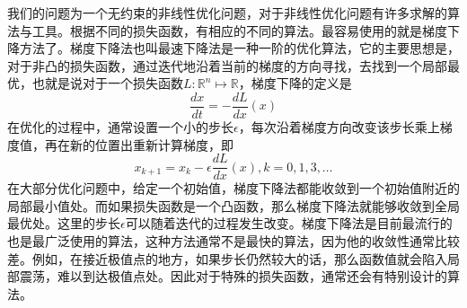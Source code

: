 我们的问题为一个无约束的非线性优化问题，对于非线性优化问题有许多求解的算法与工具。根据不同的损失函数，有相应的不同的算法。最容易使用的就是梯度下降方法了。梯度下降法也叫最速下降法是一种一阶的优化算法，它的主要思想是，对于非凸的损失函数，通过迭代地沿着当前的梯度的方向寻找，去找到一个局部最优，也就是说对于一个损失函数\(L: \mathbb{R}^n \mapsto \mathbb{R}\)，梯度下降的定义是
\begin{equation}
    \frac{dx}{dt} = - \frac{dL}{dx}(x)
\end{equation}
在优化的过程中，通常设置一个小的步长\(\epsilon\)，每次沿着梯度方向改变该步长乘上梯度值，再在新的位置出重新计算梯度，即
\begin{equation}
    x_{k+1} = x_k - \epsilon \frac{dL}{dx}(x), k = 0,1,3,\ldots
\end{equation}
在大部分优化问题中，给定一个初始值，梯度下降法都能收敛到一个初始值附近的局部最小值处。而如果损失函数是一个凸函数，那么梯度下降法就能够收敛到全局最优处。这里的步长\(\epsilon\)可以随着迭代的过程发生改变。梯度下降法是目前最流行的也是最广泛使用的算法，这种方法通常不是最快的算法，因为他的收敛性通常比较差。例如，在接近极值点的地方，如果步长仍然较大的话，那么函数值就会陷入局部震荡，难以到达极值点处。因此对于特殊的损失函数，通常还会有特别设计的算法。


